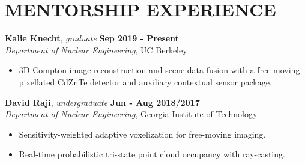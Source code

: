 \section{\small{MENTORSHIP EXPERIENCE}}

\textbf{Kalie Knecht}, \textsl{graduate} \hfill \textbf{Sep 2019 - Present} \\
\textsl{Department of Nuclear Engineering}, UC Berkeley \\[-2.8ex]
\vspace{2pt}
\begin{itemize}[leftmargin=4ex] \itemsep -2pt
    \item 3D Compton image reconstruction and scene data fusion with a free-moving pixellated CdZnTe detector and auxiliary contextual sensor package.
\end{itemize}


\textbf{David Raji}, \textsl{undergraduate} \hfill \textbf{Jun - Aug 2018/2017} \\
\textsl{Department of Nuclear Engineering}, Georgia Institute of Technology \\[-2.8ex]
\vspace{2pt}
\begin{itemize}[leftmargin=4ex] \itemsep -2pt
    \item Sensitivity-weighted adaptive voxelization for free-moving imaging.
    \item Real-time probabilistic tri-state point cloud occupancy with ray-casting.
\end{itemize}
